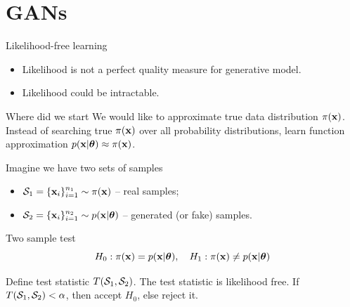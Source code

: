 \section{GANs}
\begin{frame}{Likelihood-free learning}
	\begin{itemize}
		\item Likelihood is not a perfect quality measure for generative model.
		\item Likelihood could be intractable.
	\end{itemize}
	\begin{block}{Where did we start}
	 We would like to approximate true data distribution $\pi(\mathbf{x})$.
		Instead of searching true $\pi(\mathbf{x})$ over all probability distributions, learn function approximation $p(\mathbf{x} | \boldsymbol{\theta}) \approx \pi(\mathbf{x})$.
	\end{block}
	Imagine we have two sets of samples 
	\begin{itemize}
		\item $\mathcal{S}_1 = \{\mathbf{x}_i\}_{i=1}^{n_1} \sim \pi(\mathbf{x})$ -- real samples;
		\item $\mathcal{S}_2 = \{\mathbf{x}_i\}_{i=1}^{n_2} \sim p(\mathbf{x} | \boldsymbol{\theta})$ -- generated (or fake) samples.
	\end{itemize}
	\begin{block}{Two sample test}
		\vspace{-0.3cm}
		\[
			H_0: \pi(\mathbf{x}) = p(\mathbf{x} | \boldsymbol{\theta}), \quad H_1: \pi(\mathbf{x}) \neq p(\mathbf{x} | \boldsymbol{\theta})
		\]
	\end{block}
	Define test statistic $T(\mathcal{S}_1, \mathcal{S}_2)$. The test statistic is likelihood free.
	If $T(\mathcal{S}_1, \mathcal{S}_2) < \alpha$, then accept $H_0$, else reject it.
\end{frame}

